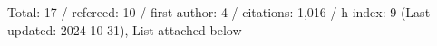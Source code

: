 Total: 17 / refereed: 10 / first author: 4 / citations: 1,016 / h-index: 9 (Last updated: 2024-10-31), List attached below